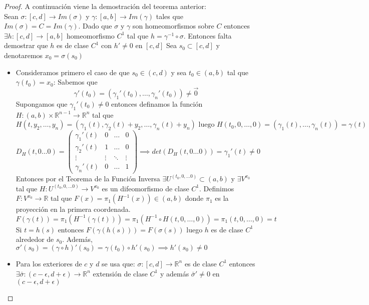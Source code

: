 \begin{proof}
    A continuación viene la demostración del teorema anterior: \\
    Sean $\sigma: [c,d] \to Im(\sigma)$ y $\gamma: [a,b] \to Im(\gamma)$ tales que $Im(\sigma) = C = Im(\gamma)$.
    Dado que $\sigma$ y $\gamma$ son homeomorfismos sobre $C$ entonces $\exists h: [c,d] \to [a,b]$ homeomorfismo $C^1$ tal que $h = \gamma^{-1} \circ \sigma$.
    Entonces falta demostrar que $h$ es de clase $C^1$ con $h' \neq 0$ en $[c,d]$
    Sea $s_0 \subset [c,d]$ y denotaremos $x_0 = \sigma(s_0)$
    \begin{itemize}
        \item     Consideramos primero el caso de que $s_0 \in (c,d)$ y sea $t_0 \in (a, b)$ tal
              que $\gamma(t_0) = x_0$: Sabemos que $$\gamma'(t_0) = (\gamma_1'(t_0), \ldots,
                  \gamma_n'(t_0)) \neq \vec{0}$$ Supongamos que $\gamma_1'(t_0) \neq 0$ entonces
              definamos la función $H: (a, b) \times \mathbb{R}^{n-1} \to \mathbb{R}^{n}$ tal
              que $$H(t, y_2, \ldots, y_n) = (\gamma_1(t), \gamma_2(t) + y_2, \ldots,
                  \gamma_n(t) + y_n) \text{ luego } H(t_0, 0, \ldots, 0) = (\gamma_1(t), \ldots,
                  \gamma_n(t)) = \gamma(t)$$ $$D_H(t, 0 \ldots 0) = \begin{pmatrix}
                      \gamma_1'(t) & 0      & \ldots & 0      \\
                      \gamma_2'(t) & 1      & \ldots & 0      \\
                      \vdots       & \vdots & \ddots & \vdots \\
                      \gamma_n'(t) & 0      & \ldots & 1
                  \end{pmatrix} \implies det(D_H(t, 0 \ldots 0)) = \gamma_1'(t) \neq 0$$
              Entonces por el Teorema de la Función Inversa $\exists U^{(t_0, 0, \ldots 0)} \subset (a, b)$ y $\exists V^{x_0}$ tal que $H: U^{(t_0, 0, \ldots 0)} \to V^{x_0}$ es un difeomorfismo de clase $C^1$. Definimos $F: V^{x_0} \to \mathbb{R}$ tal que $F(x) = \pi_1(H^{-1}(x)) \in (a,b)$ donde $\pi_1$ es la proyección en la primera coordenada. \\
              $$F(\gamma(t)) = \pi_1(H^{-1}(\gamma(t))) = \pi_1(H^{-1} \circ H(t, 0, \ldots, 0)) = \pi_1(t, 0, \ldots, 0) = t$$
              Si $t = h(s)$ entonces $F(\gamma(h(s))) = F(\sigma(s))$ luego $h$ es de clase $C^1$ alrededor de $s_0$. Además, $\sigma'(s_0) = (\gamma \circ h)'(s_0) = \gamma(t_0) \circ h'(s_0) \implies h'(s_0) \neq 0$ \\
        \item Para los exteriores de $c$ y $d$ se usa que: $\sigma: [c,d] \to \mathbb{R}^n$
              es de clase $C^1$ entonces $\exists \bar{\sigma}: (c - \epsilon, d + \epsilon)
                  \to \mathbb{R}^n$ extensión de clase $C^1$ y además $\bar{\sigma}' \neq 0$ en
              $(c - \epsilon, d + \epsilon)$
    \end{itemize}
\end{proof}

